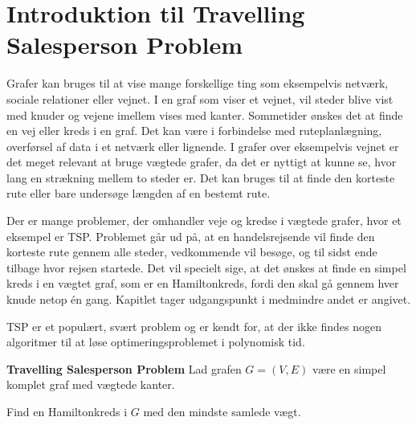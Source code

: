 \section{Introduktion til Travelling Salesperson Problem}
Grafer kan bruges til at vise mange forskellige ting som eksempelvis netværk, sociale relationer eller vejnet. 
I en graf som viser et vejnet, vil steder blive vist med knuder og vejene imellem vises med kanter.
Sommetider ønskes det at finde en vej eller kreds i en graf.
Det kan være i forbindelse med ruteplanlægning, overførsel af data i et netværk eller lignende. 
I grafer over eksempelvis vejnet er det meget relevant at bruge vægtede grafer, da det er nyttigt at kunne se, hvor lang en strækning mellem to steder er.
Det kan bruges til at finde den korteste rute eller bare undersøge længden af en bestemt rute. 

Der er mange problemer, der omhandler veje og kredse i vægtede grafer, hvor et eksempel er TSP.
Problemet går ud på, at en handelsrejsende vil finde den korteste rute gennem alle steder, vedkommende vil besøge, og til sidst ende tilbage hvor rejsen startede.
Det vil specielt sige, at det ønskes at finde en simpel kreds i en vægtet graf, som er en Hamiltonkreds, fordi den skal gå gennem hver knude netop én gang. Kapitlet tager udgangspunkt i \citep{metrictsp} medmindre andet er angivet.

TSP er et populært, svært problem og er kendt for, at der ikke findes nogen algoritmer til at løse optimeringsproblemet i polynomisk tid. 

\begin{tcolorbox}
	\textbf{Travelling Salesperson Problem} \quad Lad grafen $G=(V,E)$ være en simpel komplet graf med vægtede kanter.

	Find en Hamiltonkreds i $G$ med den mindste samlede vægt.
\end{tcolorbox}